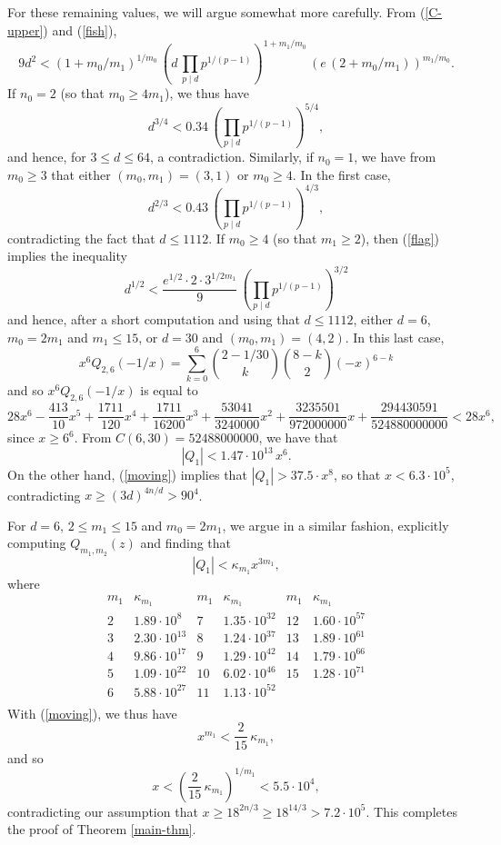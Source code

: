 For these remaining values, we will argue somewhat more carefully. From (\ref{C-upper}) and (\ref{fish}), 
\begin{equation} \label{flag}
9 d^2 < (1 + m_0/m_1)^{1/m_0}  \,  \left( d \,  \prod_{p \mid d} p^{1/(p-1)} \right)^{1+m_1/m_0} \,   (e \, (2 + m_0/m_1))^{m_1/m_0}.
\end{equation}
If $n_0=2$ (so that $m_0 \geq 4 m_1$), we thus have
$$
d^{3/4} <  0.34 \, \left( \prod_{p \mid d} p^{1/(p-1)} \right)^{5/4},
$$
and hence, for $3 \leq d \leq 64$, a contradiction. Similarly, if $n_0=1$, we have from $m_0 \geq 3$ that either $(m_0,m_1)=(3,1)$ or $m_0 \geq 4$. In the first case,
$$
d^{2/3} <  0.43 \, \left( \prod_{p \mid d} p^{1/(p-1)} \right)^{4/3},
$$
contradicting the fact that $d \leq 1112$. If $m_0 \geq 4$ (so that $m_1 \geq 2$), then (\ref{flag}) implies the inequality
$$
d^{1/2} <  \frac{e^{1/2} \cdot 2 \cdot 3^{1/2m_1}}{9}  \, \left( \prod_{p \mid d} p^{1/(p-1)} \right)^{3/2}
$$
and hence, after a short computation and using that $d \le 1112$, either $d=6$, $m_0=2m_1$ and $m_1 \leq 15$, or $d=30$ and $(m_0,m_1)=(4,2)$.
In this last case, 
$$
x^6 Q_{2,6} (-1/x) = \sum_{k=0}^{6} \binom{2 - 1/30}{k} \binom{8-k}{2} (-x)^{6-k}
$$
and so $x^6 Q_{2,6} (-1/x)$ is equal to 
$$
28 x^6-\frac{413}{10} x^5+ \frac{1711}{120} x^4+ \frac{1711}{16200} x^3+\frac{53041}{3240000} x^2+\frac{3235501}{972000000} x + \frac{294430591}{524880000000}
< 28 x^6,
$$
since $x \geq 6^6$. 
From $C(6,30)=52488000000$, we have that
$$
|Q_1| < 1.47 \cdot 10^{13} \, x^6.
$$
On the other hand,  (\ref{moving}) implies that $|Q_1| > 37.5 \cdot x^8$, so that $x < 6.3 \cdot 10^5$,
contradicting $x \geq (3d)^{4n/d} > 90^{4}$.

For $d=6$, $2 \leq m_1 \leq 15$ and $m_0=2m_1$, we argue in a similar fashion, explicitly computing $Q_{m_1,m_2} (z)$ and finding that
$$
|Q_1| < \kappa_{m_1} x^{3m_1},
$$
where
$$
\begin{array}{cc|cc|cc}
m_1 & \kappa_{m_1} & m_1 & \kappa_{m_1}  &  m_1 & \kappa_{m_1} \\ \hline
2 & 1.89 \cdot 10^8 & 7 & 1.35 \cdot 10^{32} & 12 & 1.60 \cdot 10^{57}  \\
3 & 2.30 \cdot 10^{13} & 8 & 1.24 \cdot 10^{37} &  13 & 1.89 \cdot 10^{61} \\ 
4 & 9.86 \cdot 10^{17} & 9 & 1.29 \cdot 10^{42} & 14 & 1.79 \cdot 10^{66}  \\ 
5 & 1.09 \cdot 10^{22} & 10 & 6.02 \cdot 10^{46}  & 15 & 1.28 \cdot 10^{71} \\
6 & 5.88 \cdot 10^{27} & 11 &  1.13 \cdot 10^{52} & &  \\
\end{array}
$$
With (\ref{moving}), we thus have
$$
x^{m_1} <  \frac{2}{15} \, \kappa_{m_1},
$$
and so
$$
x < \left( \frac{2}{15} \, \kappa_{m_1} \right)^{1/m_1} < 5.5 \cdot 10^4,
$$
contradicting our assumption that $x \geq 18^{2n/3} \geq 18^{14/3} > 7.2 \cdot 10^5$. This completes the proof of Theorem \ref{main-thm}.


